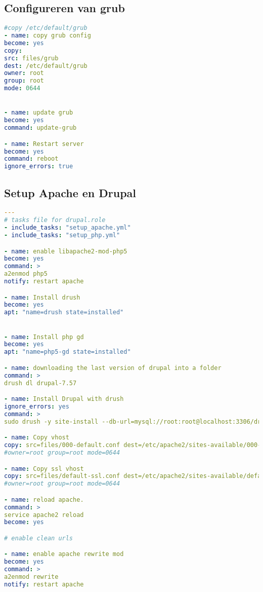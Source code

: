 \subsection{Configureren van grub}
\begin{lstlisting}[language=yaml]
#copy /etc/default/grub
- name: copy grub config
become: yes
copy:
src: files/grub
dest: /etc/default/grub
owner: root
group: root
mode: 0644


- name: update grub
become: yes
command: update-grub

- name: Restart server
become: yes
command: reboot
ignore_errors: true


\end{lstlisting}

\subsection{Setup Apache en Drupal}
\begin{lstlisting}[language=yaml, breaklines=true]
---
# tasks file for drupal.role
- include_tasks: "setup_apache.yml"
- include_tasks: "setup_php.yml"

- name: enable libapache2-mod-php5
become: yes
command: >
a2enmod php5
notify: restart apache

- name: Install drush
become: yes
apt: "name=drush state=installed"


- name: Install php gd
become: yes
apt: "name=php5-gd state=installed"

- name: downloading the last version of drupal into a folder
command: >
drush dl drupal-7.57

- name: Install Drupal with drush
ignore_errors: yes
command: >
sudo drush -y site-install --db-url=mysql://root:root@localhost:3306/drupaldb --root="/home/vagrant/drupal-7.57"

- name: Copy vhost
copy: src=files/000-default.conf dest=/etc/apache2/sites-available/000-default.conf
#owner=root group=root mode=0644

- name: Copy ssl vhost
copy: src=files/default-ssl.conf dest=/etc/apache2/sites-available/default-ssl.conf
#owner=root group=root mode=0644

- name: reload apache.
command: >
service apache2 reload
become: yes

# enable clean urls

- name: enable apache rewrite mod
become: yes
command: >
a2enmod rewrite
notify: restart apache

\end{lstlisting}

